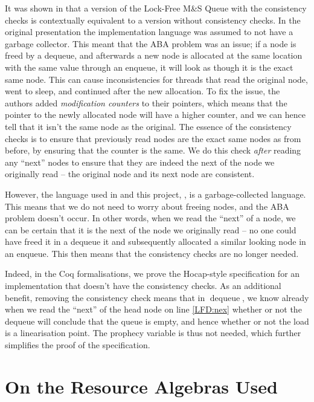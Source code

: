 \documentclass[a4paper, 10pt]{report}
\theoremstyle{definition}
\newcommand{\dequeue}{\operatorname{dequeue}}
\newcommand{\msq}{M\&S Queue}
\newcommand{\lfmsq}{Lock-Free \msq{}}
\begin{document}
It was shown in \citet{DBLP:conf/cpp/VindumB21} that a version of the \lfmsq{} with the consistency checks is contextually equivalent to a version without consistency checks. In the original presentation \citep{DBLP:conf/podc/MichaelS96} the implementation language was assumed to not have a garbage collector. This meant that the ABA problem was an issue; if a node is freed by a dequeue, and afterwards a new node is allocated at the same location with the same value through an enqueue, it will look as though it is the exact same node. This can cause inconsistencies for threads that read the original node, went to sleep, and continued after the new allocation.
To fix the issue, the authors added \textit{modification counters} to their pointers, which means that the pointer to the newly allocated node will have a higher counter, and we can hence tell that it isn't the same node as the original. The essence of the consistency checks is to ensure that previously read nodes are the exact same nodes as from before, by ensuring that the counter is the same.
We do this check \textit{after} reading any ``next'' nodes to ensure that they are indeed the next of the node we originally read -- the original node and its next node are consistent.

However, the language used in \citet{DBLP:conf/cpp/VindumB21} and this project, \heaplang, is a garbage-collected language. This means that we do not need to worry about freeing nodes, and the ABA problem doesn't occur. In other words, when we read the ``next'' of a node, we can be certain that it is the next of the node we originally read -- no one could have freed it in a dequeue it and subsequently allocated a similar looking node in an enqueue. This then means that the consistency checks are no longer needed.

Indeed, in the Coq formalisations, we prove the Hocap-style specification for an implementation that doesn't have the consistency checks. As an additional benefit, removing the consistency check means that in $\dequeue$, we know already when we read the ``next'' of the head node on line \ref{LFD:nex} whether or not the dequeue will conclude that the queue is empty, and hence whether or not the load is a linearisation point. The prophecy variable is thus not needed, which further simplifies the proof of the specification.


\chapter{On the Resource Algebras Used}
\label{ch:RA}
\end{document}
